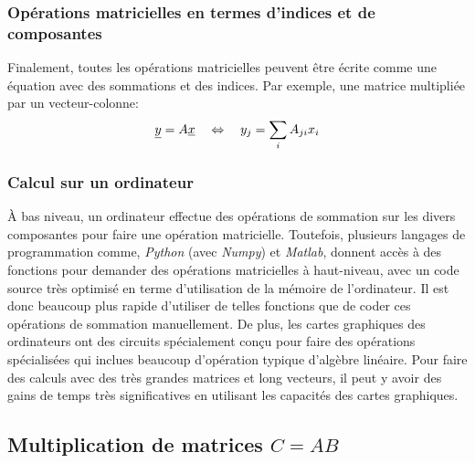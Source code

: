 \subsubsection{Opérations matricielles en termes d'indices et de composantes}
\label{sec:opmatind}

Finalement, toutes les opérations matricielles peuvent être écrite comme une équation avec des sommations et des indices. Par exemple, une matrice multipliée par un vecteur-colonne:
\begin{align}
\underline{y}  = A \underline{x} 
\quad \Leftrightarrow \quad
y_j = \sum_i{A_{ji} x_i }
\end{align}


\subsubsection{Calcul sur un ordinateur}
\label{sec:ordinateur}

À bas niveau, un ordinateur effectue des opérations de sommation sur les divers composantes pour faire une opération matricielle. Toutefois, plusieurs langages de programmation comme, \textit{Python} (avec \textit{Numpy}) et \textit{Matlab}, donnent accès à des fonctions pour demander des opérations matricielles à haut-niveau, avec un code source très optimisé en terme d'utilisation de la mémoire de l'ordinateur. Il est donc beaucoup plus rapide d'utiliser de telles fonctions que de coder ces opérations de sommation manuellement. De plus, les cartes graphiques des ordinateurs ont des circuits spécialement conçu pour faire des opérations spécialisées qui inclues beaucoup d'opération typique d'algèbre linéaire. Pour faire des calculs avec des très grandes matrices et long vecteurs, il peut y avoir des gains de temps très significatives en utilisant les capacités des cartes graphiques.


\newpage
\subsection{Multiplication de matrices $C = A B $}

